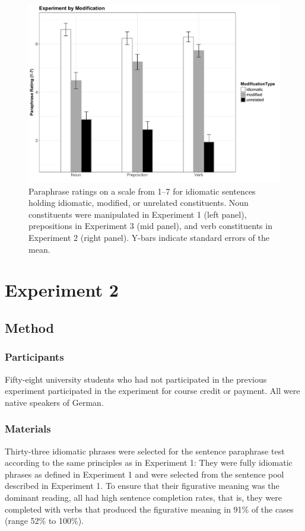 \documentclass[output=paper]{langsci/langscibook}
\begin{document}
\begin{figure}[hbt!]
  \includegraphics[width=\linewidth]{figures/smolka.pdf}
  \caption{Paraphrase ratings on a scale from 1--7 for idiomatic sentences holding idiomatic, modified, or unrelated constituents. Noun constituents were manipulated in Experiment 1 (left panel), prepositions in Experiment 3 (mid panel), and verb constituents in Experiment 2 (right panel). Y-bars indicate standard errors of the mean.}
  \label{fig:chart}
\end{figure}



\section{Experiment 2}

\subsection{Method}

\subsubsection{Participants}
Fifty-eight university students who had not participated in the previous experiment participated in the experiment for course credit or payment. All were native speakers of German. 

\subsubsection{Materials}
Thirty-three idiomatic phrases were selected for the sentence paraphrase test according to the same principles as in Experiment 1: They were fully idiomatic phrases as defined in Experiment 1 and were selected from the sentence pool described in Experiment 1. To ensure that their figurative meaning was the dominant reading, all had high sentence completion rates, that is, they were completed with verbs that produced the figurative meaning in 91\% of the cases (range 52\% to 100\%).
\end{document}
